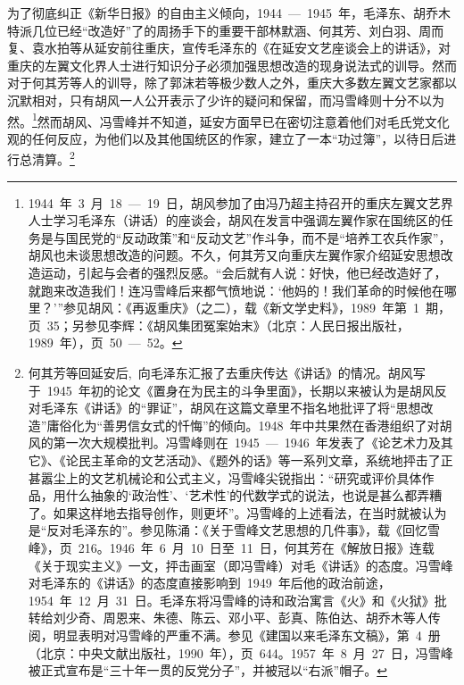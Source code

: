 为了彻底纠正《新华日报》的自由主义倾向，1944~—~1945~年，毛泽东、胡乔木特派几位已经“改造好”了的周扬手下的重要干部林默涵、何其芳、刘白羽、周而复、袁水拍等从延安前往重庆，宣传毛泽东的《在延安文艺座谈会上的讲话》，对重庆的左翼文化界人士进行知识分子必须加强思想改造的现身说法式的训导。然而对于何其芳等人的训导，除了郭沫若等极少数人之外，重庆大多数左翼文艺家都以沉默相对，只有胡风一人公开表示了少许的疑问和保留，而冯雪峰则十分不以为然。\footnote{1944~年~3~月~18~—~19~日，胡风参加了由冯乃超主持召开的重庆左翼文艺界人士学习毛泽东（讲话）的座谈会，胡风在发言中强调左翼作家在国统区的任务是与国民党的“反动政策”和“反动文艺”作斗争，而不是“培养工农兵作家”，胡风也未谈思想改造的问题。不久，何其芳又向重庆左翼作家介绍延安思想改造运动，引起与会者的强烈反感。“会后就有人说：好快，他已经改造好了，就跑来改造我们！连冯雪峰后来都气愤地说：‘他妈的！我们革命的时候他在哪里？’”参见胡风：《再返重庆》（之二），载《新文学史料》，1989~年第~1~期，页~35；另参见李辉：《胡风集团冤案始末》（北京：人民日报出版社，1989~年），页~50~—~52。}然而胡风、冯雪峰并不知道，延安方面早已在密切注意着他们对毛氏党文化观的任何反应，为他们以及其他国统区的作家，建立了一本“功过簿”，以待日后进行总清算。\footnote{何其芳等回延安后,~向毛泽东汇报了去重庆传达《讲话》的情况。胡风写于~1945~年初的论文《置身在为民主的斗争里面》，长期以来被认为是胡风反对毛泽东《讲话》的“罪证”，胡风在这篇文章里不指名地批评了将“思想改造”庸俗化为“善男信女式的忏悔”的倾向。1948~年中共果然在香港组织了对胡风的第一次大规模批判。冯雪峰则在~1945~—~1946~年发表了《论艺术力及其它》、《论民主革命的文艺活动》、《题外的话》等一系列文章，系统地抨击了正甚嚣尘上的文艺机械论和公式主义，冯雪峰尖锐指出：“研究或评价具体作品，用什么抽象的‘政治性’、‘艺术性’的代数学式的说法，也说是甚么都弄糟了。如果这样地去指导创作，则更坏”。冯雪峰的上述看法，在当时就被认为是“反对毛泽东的”。参见陈涌：《关于雪峰文艺思想的几件事》，载《回忆雪峰》，页~216。1946~年~6~月~10~日至~11~日，何其芳在《解放日报》连载《关于现实主义》一文，抨击画室（即冯雪峰）对毛《讲话》的态度。冯雪峰对毛泽东的《讲话》的态度直接影响到~1949~年后他的政治前途，1954~年~12~月~31~日。毛泽东将冯雪峰的诗和政治寓言《火》和《火狱》批转给刘少奇、周恩来、朱德、陈云、邓小平、彭真、陈伯达、胡乔木等人传阅，明显表明对冯雪峰的严重不满。参见《建国以来毛泽东文稿》，第~4~册（北京：中央文献出版社，1990~年），页~644。1957~年~8~月~27~日，冯雪峰被正式宣布是“三十年一贯的反党分子”，并被冠以“右派”帽子。}

